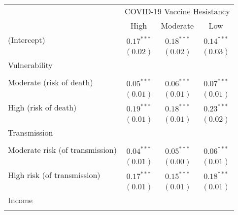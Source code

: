 
\begin{table}
\begin{center}
\begin{scriptsize}
\begin{tabular}{l c c c}
\hline
 & \multicolumn{3}{c}{COVID-19 Vaccine Hesistancy} \\
\cline{2-4}
 & High & Moderate & Low \\
\hline
(Intercept)                                     & $0.17^{***}$  & $0.18^{***}$ & $0.14^{***}$  \\
                                                & $(0.02)$      & $(0.02)$     & $(0.03)$      \\
Vulnerability                                   &               &              &               \\
                                                &               &              &               \\
\quad Moderate (risk of death)                  & $0.05^{***}$  & $0.06^{***}$ & $0.07^{***}$  \\
                                                & $(0.01)$      & $(0.01)$     & $(0.01)$      \\
\quad High (risk of death)                      & $0.19^{***}$  & $0.18^{***}$ & $0.23^{***}$  \\
                                                & $(0.01)$      & $(0.01)$     & $(0.02)$      \\
Transmission                                    &               &              &               \\
                                                &               &              &               \\
\quad Moderate risk (of transmission)           & $0.04^{***}$  & $0.05^{***}$ & $0.06^{***}$  \\
                                                & $(0.01)$      & $(0.00)$     & $(0.01)$      \\
\quad High risk (of transmission)               & $0.17^{***}$  & $0.15^{***}$ & $0.18^{***}$  \\
                                                & $(0.01)$      & $(0.01)$     & $(0.01)$      \\
Income                                          &               &              &               \\
                                                &               &              &               \\

\end{tabular}
\end{scriptsize}
\end{center}
\end{table}
